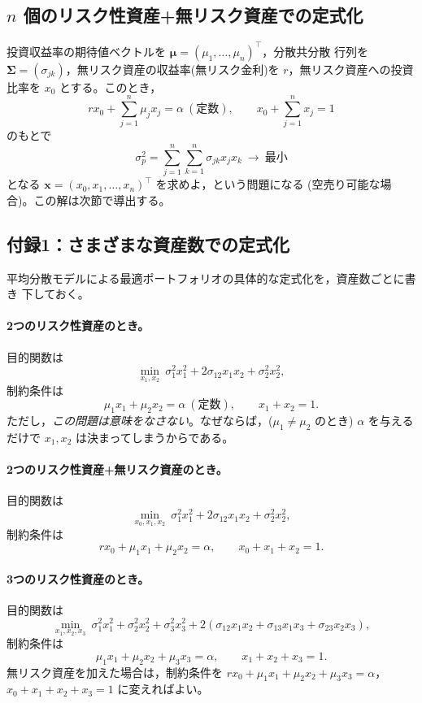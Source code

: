 \subsection{$n$ 個のリスク性資産+無リスク資産での定式化}

投資収益率の期待値ベクトルを $\bm{\mu} = (\mu_1,\dots,\mu_n)^\top$，分散共分散
行列を $\bm{\Sigma} = (\sigma_{jk})$，無リスク資産の収益率(無リスク金利)を
$r$，無リスク資産への投資比率を $x_0$ とする。このとき，
\[
r x_0 + \sum_{j=1}^n \mu_j x_j = \alpha\ (\text{定数}),\qquad
x_0 + \sum_{j=1}^n x_j = 1
\]
のもとで
\[
\sigma_p^2 = \sum_{j=1}^{n}\sum_{k=1}^{n}\sigma_{jk}x_j x_k\ \to\ \text{最小}
\]
となる $\bm{x} = (x_0, x_1,\dots,x_n)^\top$ を求めよ，という問題になる
(空売り可能な場合)。この解は次節で導出する。

\subsection*{付録1：さまざまな資産数での定式化}

平均分散モデルによる最適ポートフォリオの具体的な定式化を，資産数ごとに書き
下しておく。

\paragraph{2つのリスク性資産のとき。}目的関数は
\[
\min_{x_1,x_2}\ \sigma_1^2 x_1^2 + 2\sigma_{12}x_1x_2 + \sigma_2^2 x_2^2,
\]
制約条件は
\[
\mu_1 x_1 + \mu_2 x_2 = \alpha\ (\text{定数}),\qquad x_1 + x_2 = 1.
\]
ただし，\emph{この問題は意味をなさない}。なぜならば，($\mu_1\neq\mu_2$ のとき)
$\alpha$ を与えるだけで $x_1, x_2$ は決まってしまうからである。

\paragraph{2つのリスク性資産+無リスク資産のとき。}目的関数は
\[
\min_{x_0,x_1,x_2}\ \sigma_1^2 x_1^2 + 2\sigma_{12}x_1x_2 + \sigma_2^2 x_2^2,
\]
制約条件は
\[
r x_0 + \mu_1 x_1 + \mu_2 x_2 = \alpha,\qquad x_0 + x_1 + x_2 = 1.
\]

\paragraph{3つのリスク性資産のとき。}目的関数は
\[
\min_{x_1,x_2,x_3}\ \sigma_1^2x_1^2 + \sigma_2^2x_2^2 + \sigma_3^2x_3^2
+ 2(\sigma_{12}x_1x_2 + \sigma_{13}x_1x_3 + \sigma_{23}x_2x_3),
\]
制約条件は
\[
\mu_1x_1 + \mu_2x_2 + \mu_3x_3 = \alpha,\qquad x_1+x_2+x_3 = 1.
\]
無リスク資産を加えた場合は，制約条件を
$rx_0 + \mu_1x_1 + \mu_2x_2 + \mu_3x_3 = \alpha$，
$x_0+x_1+x_2+x_3=1$ に変えればよい。

